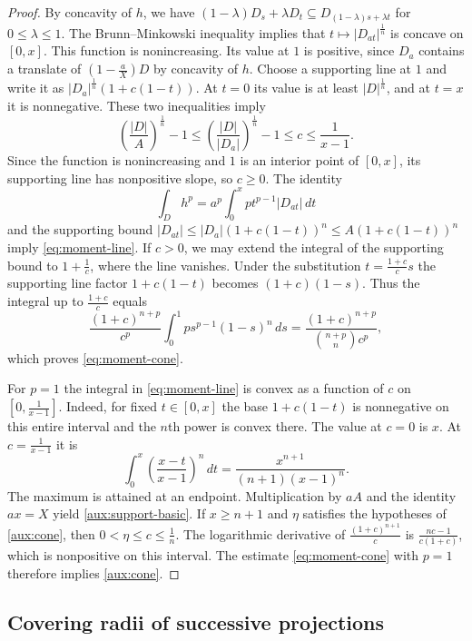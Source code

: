 \documentclass[reqno, 11pt]{article}
\numberwithin{equation}{section}
\theoremstyle{definition}
\begin{document}
\begin{proof}
By concavity of $h$, we have
$(1-\lambda)D_s+\lambda D_t\subseteq D_{(1-\lambda)s+\lambda t}$
for $0\le\lambda\le1$. The Brunn--Minkowski inequality implies that
$t\mapsto |D_{at}|^{\frac{1}{n}}$ is concave on $[0,x]$. This function is
nonincreasing. Its value at $1$ is positive, since $D_a$ contains a
translate of $(1-\frac{a}{X})D$ by concavity of $h$. Choose a supporting
line at $1$ and write it as $|D_a|^{\frac{1}{n}}(1+c(1-t))$. At $t=0$ its
value is at least $|D|^{\frac{1}{n}}$, and at $t=x$ it is nonnegative. These
two inequalities imply
\[
 \left(\frac{|D|}{A}\right)^{\frac{1}{n}}-1
 \le\left(\frac{|D|}{|D_a|}\right)^{\frac{1}{n}}-1
 \le c\le\frac{1}{x-1}.
\]
Since the function is nonincreasing and $1$ is an interior point of
$[0,x]$, its supporting line has nonpositive slope, so $c\ge0$.
The identity
\[
             \int_D h^p=a^p\int_0^x pt^{p-1}|D_{at}|\,dt
\]
and the supporting bound
$|D_{at}|\le |D_a|(1+c(1-t))^n\le A(1+c(1-t))^n$
imply \eqref{eq:moment-line}. If $c>0$, we may extend the
integral of the supporting bound to $1+\frac{1}{c}$, where the line vanishes.
Under the substitution $t=\frac{1+c}{c}s$ the supporting line
factor $1+c(1-t)$ becomes $(1+c)(1-s)$. Thus the integral up to
$\frac{1+c}{c}$ equals
\[
 \frac{(1+c)^{n+p}}{c^p}\int_0^1 p s^{p-1}(1-s)^n\,ds
 =\frac{(1+c)^{n+p}}{\binom{n+p}{n}c^p},
\]
which proves \eqref{eq:moment-cone}.

For $p=1$ the integral in \eqref{eq:moment-line} is convex as a
function of $c$ on $[0,\frac{1}{x-1}]$. Indeed, for fixed $t\in[0,x]$
the base $1+c(1-t)$ is nonnegative on this entire interval and
the $n$th power is convex there. The value at $c=0$ is $x$.
At $c=\frac{1}{x-1}$ it is
\[
 \int_0^x\left(\frac{x-t}{x-1}\right)^n\,dt
  =\frac{x^{n+1}}{(n+1)(x-1)^n}.
\]
The maximum is attained at an endpoint. Multiplication by $aA$
and the identity $ax=X$ yield \eqref{aux:support-basic}.
If $x\ge n+1$ and $\eta$ satisfies the hypotheses of
\eqref{aux:cone}, then $0<\eta\le c\le\frac{1}{n}$. The logarithmic
derivative of $\frac{(1+c)^{n+1}}{c}$ is
$\frac{nc-1}{c(1+c)}$, which is nonpositive on this interval.
The estimate \eqref{eq:moment-cone} with $p=1$ therefore implies
\eqref{aux:cone}.
\end{proof}

\subsection{Covering radii of successive projections}
\end{document}
